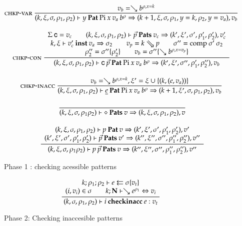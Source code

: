 \begin{figure}[p]
\begin{gather*}
\nru{\chkpvar}
{v_b = \wh \cl{b}{\ins{\rho}{x}{k}}}
{
\checkp
{k,\xi,\sigma,\rho_1,\rho_2}
{y}
{\vpi \: x \: v_a \: \cl{b}{\rho}}
{k+1,\xi,\sigma,\ins{\rho_1}{y}{k},\ins{\rho_2}{y}{v_a}}
{v_b}}
\\[2ex]
\nxru{\chkpcon}
{\Sig \: {\cc}=v_c \qquad
\checkps{k,\xi,\sigma,\rho_1,\rho_2}
{\vec{p}}
{v_c}
{k',\xi',\sigma',\rho_1',\rho_2'}
{v'_c}
}
{\inst{k}{\xi}{v'_c}{v_a}{\sigma_2}
\qquad
v_p = \ptv{k}{p}    
\qquad
\sigma'' = \compS{\sigma'}{\sigma_2}
}
{
\rho''_2 = \substEnv{\sigma''}{\rho'_2} \qquad
v_b = \subst{\sigma''}{\wh \cl{b}{\ins{\rho}{x}{v_p}}}
}
{\checkp
{k,\xi,\sigma,\rho_1,\rho_2}
{\cc \: \vec{p}}
{\vpi \: x \: v_a \: \cl{b}{\rho}}
{k',\xi',\sigma'',\rho'_1,\rho''_2}
{v_b}
}
\\[2ex]
\nru{\chkpinacc}
{v_b = \wh \cl{b}{\ins{\rho}{x}{k}} , \xi' = \xi \cup \{ (k,(e,v_a)) \} } 
{
\checkp
{k,\xi,\sigma,\rho_1,\rho_2}
{\inacc{e}}
{\vpi \: x \: v_a \: \cl{b}{\rho}}
{k+1,\xi',\sigma,\rho_1,\rho_2}
{v_b}}
\\[2ex]
\nru{}
{}
{
\checkps
{k,\xi,\sigma,\rho_1\rho_2}
{\diamond}
{v}
{k,\xi,\sigma,\rho_1,\rho_2}
{v}}
\\[2ex]
\ndru{}
{\checkp
{k,\xi,\sigma,\rho_1,\rho_2}
{p}
{v}
{k',\xi',\sigma',\rho'_1,\rho'_2}
{v'}
}
{\checkps
{k',\xi',\sigma',\rho'_1,\rho'_2}
{\vec{p}}
{v'}
{k'',\xi'',\sigma'',\rho''_1,\rho''_2}
{v''}
}
{
\checkps
{k,\xi,\sigma,\rho_1\rho_2}
{p \: \vec{p}}
{v}
{k'',\xi'',\sigma'',\rho''_1,\rho''_2}
{v''}}
\end{gather*}
\caption{Phase 1 : checking acessible patterns}
\end{figure}

\begin{figure}[p]
\begin{gather*}
\ \dfrac{\begin{array}[b]{c}
k;\rho_1;\rho_2\vdash e\leftleftarrows\sigma\{v_t\}
\\
(i,v_i) \in \sigma \qquad k;\mathbf{N}\vdash\searrow e^{\rho_1}\Leftrightarrow v_i
\end{array}}{
(k,\sigma,\rho_1,\rho_2)\vdash i\:\mathbf{checkinacc}\:e : v_t
}
\end{gather*}
\caption{Phase 2: Checking inaccesible patterns}
\end{figure}

